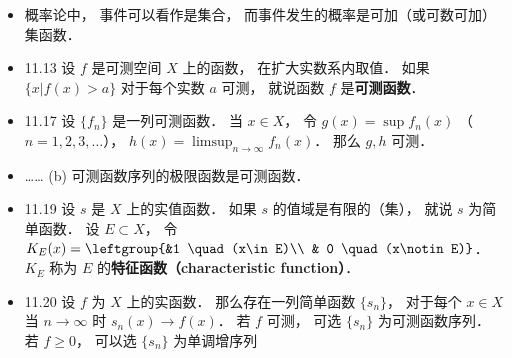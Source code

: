 \begin{itemize}
\item 概率论中， 事件可以看作是集合， 而事件发生的概率是可加（或可数可加）集函数．

\item 11.13 设 $f$ 是可测空间 $X$ 上的函数， 在扩大实数系内取值． 如果 $\{x|f(x)>a\}$ 对于每个实数 $a$ 可测， 就说函数 $f$ 是\textbf{可测函数}．

\item 11.17 设 $\{f_n\}$ 是一列可测函数． 当 $x\in X$， 令 $g(x)=\sup f_n(x)$ （$n=1,2,3,\dots$）， $h(x)=\limsup_{n\to\infty} f_n(x)$． 那么 $g,h$ 可测．

\item …… (b) 可测函数序列的极限函数是可测函数．

\item 11.19 设 $s$ 是 $X$ 上的实值函数． 如果 $s$ 的值域是有限的（集）， 就说 $s$ 为简单函数． 设 $E\subset X$， 令 $K_E(x)=\leftgroup{&1 \quad  (x\in E)\\ & 0 \quad (x\notin E)}$． $K_E$ 称为 $E$ 的\textbf{特征函数（characteristic function）}．

\item 11.20 设 $f$ 为 $X$ 上的实函数． 那么存在一列简单函数 $\{s_n\}$， 对于每个 $x\in X$ 当 $n\to\infty$ 时 $s_n(x)\to f(x)$． 若 $f$ 可测， 可选 $\{s_n\}$ 为可测函数序列． 若 $f\geqslant 0$， 可以选 $\{s_n\}$ 为单调增序列
\end{itemize}
